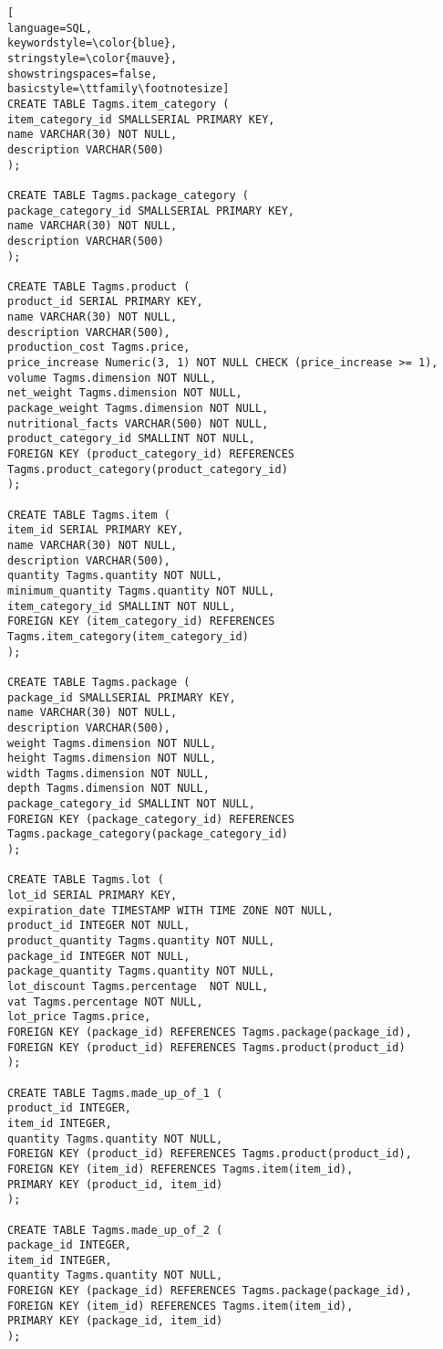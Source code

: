 \begin{lstlisting}[
language=SQL,
keywordstyle=\color{blue},
stringstyle=\color{mauve},
showstringspaces=false,
basicstyle=\ttfamily\footnotesize]
CREATE TABLE Tagms.item_category (
item_category_id SMALLSERIAL PRIMARY KEY,
name VARCHAR(30) NOT NULL,
description VARCHAR(500)
);

CREATE TABLE Tagms.package_category (
package_category_id SMALLSERIAL PRIMARY KEY,
name VARCHAR(30) NOT NULL,
description VARCHAR(500)
);

CREATE TABLE Tagms.product (
product_id SERIAL PRIMARY KEY,
name VARCHAR(30) NOT NULL,
description VARCHAR(500),
production_cost Tagms.price,
price_increase Numeric(3, 1) NOT NULL CHECK (price_increase >= 1),
volume Tagms.dimension NOT NULL,
net_weight Tagms.dimension NOT NULL,
package_weight Tagms.dimension NOT NULL,
nutritional_facts VARCHAR(500) NOT NULL,
product_category_id SMALLINT NOT NULL,
FOREIGN KEY (product_category_id) REFERENCES Tagms.product_category(product_category_id)
);

CREATE TABLE Tagms.item (
item_id SERIAL PRIMARY KEY,
name VARCHAR(30) NOT NULL,
description VARCHAR(500),
quantity Tagms.quantity NOT NULL,
minimum_quantity Tagms.quantity NOT NULL,
item_category_id SMALLINT NOT NULL,
FOREIGN KEY (item_category_id) REFERENCES Tagms.item_category(item_category_id)
);

CREATE TABLE Tagms.package (
package_id SMALLSERIAL PRIMARY KEY,
name VARCHAR(30) NOT NULL,
description VARCHAR(500),
weight Tagms.dimension NOT NULL,
height Tagms.dimension NOT NULL,
width Tagms.dimension NOT NULL,
depth Tagms.dimension NOT NULL,
package_category_id SMALLINT NOT NULL,
FOREIGN KEY (package_category_id) REFERENCES Tagms.package_category(package_category_id)
);

CREATE TABLE Tagms.lot (
lot_id SERIAL PRIMARY KEY,
expiration_date TIMESTAMP WITH TIME ZONE NOT NULL,
product_id INTEGER NOT NULL,
product_quantity Tagms.quantity NOT NULL,
package_id INTEGER NOT NULL,
package_quantity Tagms.quantity NOT NULL,
lot_discount Tagms.percentage  NOT NULL,
vat Tagms.percentage NOT NULL,
lot_price Tagms.price,
FOREIGN KEY (package_id) REFERENCES Tagms.package(package_id),
FOREIGN KEY (product_id) REFERENCES Tagms.product(product_id)
);

CREATE TABLE Tagms.made_up_of_1 (
product_id INTEGER,
item_id INTEGER,
quantity Tagms.quantity NOT NULL,
FOREIGN KEY (product_id) REFERENCES Tagms.product(product_id),
FOREIGN KEY (item_id) REFERENCES Tagms.item(item_id),
PRIMARY KEY (product_id, item_id)
);

CREATE TABLE Tagms.made_up_of_2 (
package_id INTEGER,
item_id INTEGER,
quantity Tagms.quantity NOT NULL,
FOREIGN KEY (package_id) REFERENCES Tagms.package(package_id),
FOREIGN KEY (item_id) REFERENCES Tagms.item(item_id),
PRIMARY KEY (package_id, item_id)
);


\end{lstlisting}
